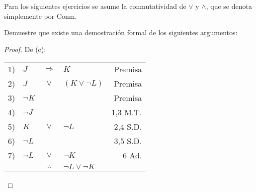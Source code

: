 \documentclass[12pt]{report}
\theoremstyle{largebreak}
\begin{document}
    \begin{obs}
        Para los siguientes ejercicios se asume la conmutatividad de $\lor$ y $\land$, que se denota simplemente por Conm.
    \end{obs}

    \begin{excer}
        Demuestre que existe una demostración formal de los siguientes argumentos:
    \end{excer}

    \begin{proof}
        De (c):
        \begin{center}
            \begin{tabular}{l l c l r}
                1) & $J$ & $\Rightarrow$ & $K$ & Premisa \\
                2) & $J$ & $\lor$ & $(K\lor\neg L)$ & Premisa \\
                3) & $\neg K$ &  &  & Premisa \\
                4) & $\neg J$ &  &  & 1,3 M.T.\\
                5) & $K$ & $\lor$ & $\neg L$ & 2,4 S.D.\\
                6) & $\neg L$ &  &  & 3,5 S.D.\\
                7) & $\neg L$ & $\lor$ & $\neg K$ & 6 Ad. \\
                \hline
                & & $\therefore$ & $\neg L\lor\neg K$ & \\
            \end{tabular}
        \end{center}


\end{proof}
\end{document}
